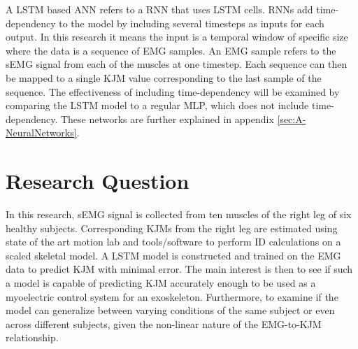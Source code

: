 \documentclass[../main.tex]{subfiles}
\begin{document}
A \ac{LSTM} based \ac{ANN} refers to a \ac{RNN} that uses \ac{LSTM} cells.
\acp{RNN} add time-dependency to the model by including several timesteps as inputs for each output.
In this research it means the input is a temporal window of specific size where the data is a sequence of \ac{EMG} samples.
An \ac{EMG} sample refers to the \ac{sEMG} signal from each of the muscles at one timestep.
Each sequence can then be mapped to a single \ac{KJM} value corresponding to the last sample of the sequence.
The effectiveness of including time-dependency will be examined by comparing the \ac{LSTM} model to a regular \ac{MLP}, which does not include time-dependency.
These networks are further explained in appendix \ref{sec:A-NeuralNetworks}.

\section{Research Question}
In this research, \ac{sEMG} signal is collected from ten muscles of the right leg of six healthy subjects. 
Corresponding \acp{KJM} from the right leg are estimated using state of the art motion lab and tools/software to perform \ac{ID} calculations on a scaled skeletal model.
A \ac{LSTM} model is constructed and trained on the \ac{EMG} data to predict \ac{KJM} with minimal error.
The main interest is then to see if such a model is capable of predicting \ac{KJM} accurately enough to be used as a myoelectric control system for an exoskeleton.
Furthermore, to examine if the model can generalize between varying conditions of the same subject or even across different subjects, given the non-linear nature of the \ac{EMG}-to-\ac{KJM} relationship.
\end{document}
